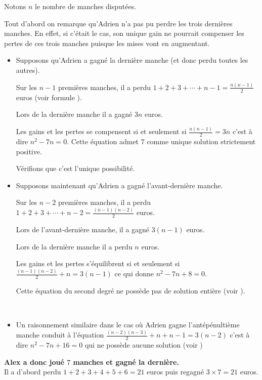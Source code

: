 \begin{solution}

Notons $n$ le nombre de manches disputées.
\par
Tout d'abord on remarque qu'Adrien n'a pas pu perdre les trois dernières manches. En effet, si c'était le cas, son unique gain ne pourrait compenser les pertes de ces trois manches puisque les mises vont en augmentant.

\begin{itemize}
     \item
     Supposons qu'Adrien a gagné la dernière manche (et donc perdu toutes les autres).
     \par
     Sur les $n-1$ premières manches, il a perdu $1+2+3+\cdots+n-1 =\frac{n(n-1)}{2}$ euros (voir formule ).
     \par
     Lors de la dernière manche il a gagné $3n$ euros.
     \par
     Les gains et les pertes se compensent si et seulement si $\frac{n(n-1)}{2}=3n$ c'est à dire $n^2-7n=0$. Cette équation admet $7$ comme unique solution strictement positive.
     \par
     Vérifions que c'est l'unique possibilité.

     \item
     Supposons maintenant qu'Adrien a gagné l'avant-dernière manche.
     \par
     Sur les $n-2$ premières manches, il a perdu $1+2+3+\cdots+n-2 =\frac{(n-1)(n-2)}{2}$ euros.
     \par
     Lors de l'avant-dernière manche, il a gagné $3(n-1)$ euros.
     \par
     Lors de la dernière manche il a perdu $n$ euros.
     \par
     Les gains et les pertes s'équilibrent si et seulement si $\frac{(n-1)(n-2)}{2}+n=3(n-1)$ ce qui donne $n^2-7n+8=0$.
     \par
     Cette équation du second degré ne possède pas de solution entière (voir ).
     \par
     ~
     \item
     Un raisonnement similaire dans le cas où Adrien gagne l'antépénultième manche conduit à l'équation $\frac{(n-2)(n-3)}{2}+n+n-1=3(n-2)$ c'est à dire $n^2-7n+16=0$ qui ne possède aucune solution (voir )
\end{itemize}
\textbf{Alex a donc joué $7$ manches et gagné la dernière.}
\\
Il a d'abord perdu $1+2+3+4+5+6=21$ euros puis regagné $3 \times 7=21$ euros.


\end{solution}

